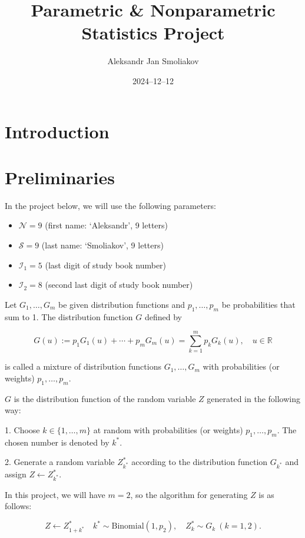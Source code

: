 \documentclass{article}
\title{Parametric \& Nonparametric Statistics Project}
\author{Aleksandr Jan Smoliakov}
\date{2024--12--12}
\begin{document}
\maketitle

\section{Introduction}



\section{Preliminaries}

In the project below, we will use the following parameters:
\begin{itemize}
    \item $\mathcal{N} = 9$ (first name: `Aleksandr', 9 letters)
    \item $\mathcal{S} = 9$ (last name: `Smoliakov', 9 letters)
    \item $\mathcal{I}_1 = 5$ (last digit of study book number)
    \item $\mathcal{I}_2 = 8$ (second last digit of study book number)
\end{itemize}

Let \(G_1, \ldots, G_m\) be given distribution functions and \(p_1, \ldots, p_m\) be probabilities that sum to 1. The distribution function \(G\) defined by

\[
G(u) := p_1 G_1(u) + \cdots + p_m G_m(u) = \sum_{k=1}^m p_k G_k(u), \quad u \in \mathbb{R}
\]

is called a mixture of distribution functions \(G_1, \ldots, G_m\) with probabilities (or weights) \(p_1, \ldots, p_m\).

\(G\) is the distribution function of the random variable \(Z\) generated in the following way:

1. Choose \(k \in \{1, \ldots, m\}\) at random with probabilities (or weights) \(p_1, \ldots, p_m\). The chosen number is denoted by \(k^*\).

2. Generate a random variable \(Z^*_{k^*}\) according to the distribution function \(G_{k^*}\) and assign \(Z \leftarrow Z^*_{k^*}\).

In this project, we will have \(m = 2\), so the algorithm for generating \(Z\) is as follows:

\[
Z \leftarrow Z^*_{1+k^*} \quad k^* \sim \text{Binomial}(1, p_2), \quad Z^*_{k} \sim G_k \ (k = 1, 2).
\]
\end{document}
